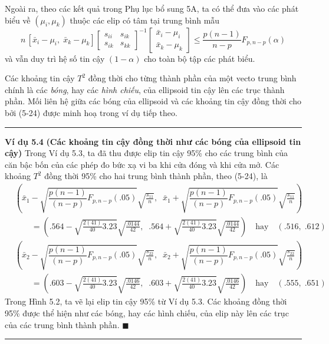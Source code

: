 Ngoài ra, theo các kết quả trong Phụ lục bổ sung 5A, ta có thể đưa vào các phát biểu về $(\mu_i,\mu_k)$ thuộc các elip có tâm tại trung bình mẫu
\begin{equation}\tag{5-26}
  n\,[\bar{x}_i-\mu_i,\;\bar{x}_k-\mu_k]
  \begin{bmatrix} s_{ii} & s_{ik}\\ s_{ik} & s_{kk}\end{bmatrix}^{-1}
  \begin{bmatrix}\bar{x}_i-\mu_i\\ \bar{x}_k-\mu_k\end{bmatrix}
  \le \frac{p(n-1)}{n-p}F_{p,n-p}(\alpha)
\end{equation}
và vẫn duy trì hệ số tin cậy $(1-\alpha)$ cho toàn bộ tập các phát biểu.
 
Các khoảng tin cậy $T^2$ đồng thời cho từng thành phần của một vecto trung bình chính là các \emph{bóng}, hay các \emph{hình chiếu}, của ellipsoid tin cậy lên các trục thành phần. Mối liên hệ giữa các bóng của ellipsoid và các khoảng tin cậy đồng thời cho bởi (5-24) được minh hoạ trong ví dụ tiếp theo.
 
\bigskip\hrule\medskip
\noindent\textbf{Ví dụ 5.4} \textbf{(Các khoảng tin cậy đồng thời như các bóng của ellipsoid tin cậy)}
Trong Ví dụ 5.3, ta đã thu được elip tin cậy 95\% cho các trung bình của căn bậc bốn của các phép đo bức xạ vi ba khi cửa đóng và khi cửa mở. Các khoảng $T^2$ đồng thời 95\% cho hai trung bình thành phần, theo (5-24), là
{\footnotesize
\begin{align*}
  &\left(\bar{x}_1-\sqrt{\dfrac{p(n-1)}{(n-p)}F_{p,n-p}(.05)}\sqrt{\frac{s_{11}}{n}},\;\;
         \bar{x}_1+\sqrt{\dfrac{p(n-1)}{(n-p)}F_{p,n-p}(.05)}\sqrt{\frac{s_{11}}{n}}\right)\\
  &\qquad=\left(.564-\sqrt{\frac{2(41)}{40}3.23}\sqrt{\frac{.0144}{42}},\;\;
               .564+\sqrt{\frac{2(41)}{40}3.23}\sqrt{\frac{.0144}{42}}\right)
   \quad\text{hay}\quad (.516,\;.612)\\[6pt]
  &\left(\bar{x}_2-\sqrt{\dfrac{p(n-1)}{(n-p)}F_{p,n-p}(.05)}\sqrt{\frac{s_{22}}{n}},\;\;
         \bar{x}_2+\sqrt{\dfrac{p(n-1)}{(n-p)}F_{p,n-p}(.05)}\sqrt{\frac{s_{22}}{n}}\right)\\
  &\qquad=\left(.603-\sqrt{\frac{2(41)}{40}3.23}\sqrt{\frac{.0146}{42}},\;\;
               .603+\sqrt{\frac{2(41)}{40}3.23}\sqrt{\frac{.0146}{42}}\right)
   \quad\text{hay}\quad (.555,\;.651)
\end{align*}}
Trong Hình 5.2, ta vẽ lại elip tin cậy 95\% từ Ví dụ 5.3. Các khoảng đồng thời 95\% được thể hiện như các bóng, hay các hình chiếu, của elip này lên các trục của các trung bình thành phần. \hfill$\blacksquare$
\medskip\hrule\bigskip
 
